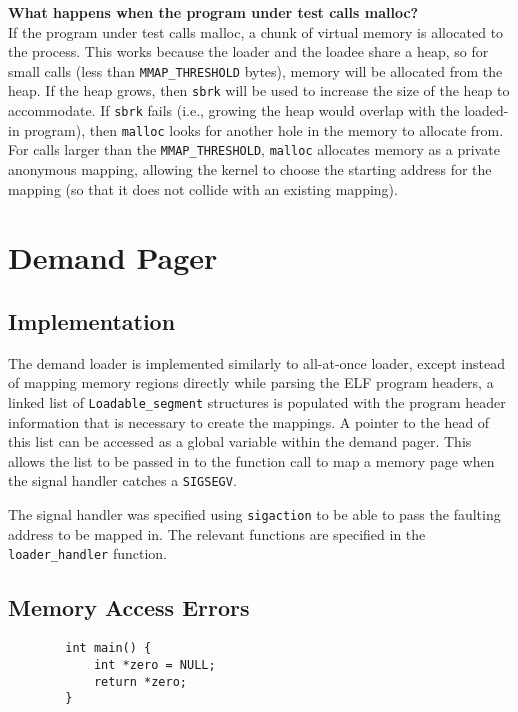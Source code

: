 \documentclass[a4paper]{article}
\begin{document}
{                    
\textbf{What happens when the program under test calls malloc?}\\
If the program under test calls malloc, a chunk of virtual memory is allocated to the process. This works because the loader and the loadee share a heap, so for small calls (less than \verb|MMAP_THRESHOLD| bytes), memory will be allocated from the heap. If the heap grows, then \verb|sbrk| will be used to increase the size of the heap to accommodate. If \verb|sbrk| fails (i.e., growing the heap would overlap with the loaded-in program), then \verb|malloc| looks for another hole in the memory to allocate from. For calls larger than the \verb|MMAP_THRESHOLD|, \verb|malloc| allocates memory as a private anonymous mapping, allowing the kernel to choose the starting address for the mapping (so that it does not collide with an existing mapping). 



\section{Demand Pager}
\subsection{Implementation}
The demand loader is implemented similarly to all-at-once loader, except instead of mapping memory regions directly while parsing the ELF program headers, a linked list of \verb|Loadable_segment| structures is populated with the program header information that is necessary to create the mappings. A pointer to the head of this list can be accessed as a global variable within the demand pager. This allows the list to be passed in to the function call to map a memory page when the signal handler catches a \verb|SIGSEGV|. 

The signal handler was specified using \verb|sigaction| to be able to pass the faulting address to be mapped in. The relevant functions are specified in the \verb|loader_handler| function.

\subsection{Memory Access Errors}
\begin{verbatim}
        int main() {
            int *zero = NULL;
            return *zero;
        }
\end{verbatim}

}
\end{document}
